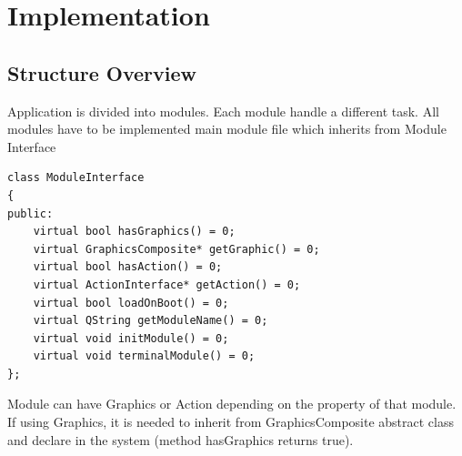 \documentclass[11pt]{article}
\begin{document}
\begin{figure}[H] 
  \label{fig:Gantt}
\end{figure} 

\section{Implementation}
\subsection{Structure Overview} 
Application is divided into modules. Each module handle a different task.
All modules have to be implemented main module file which inherits from Module Interface

\begin{lstlisting}
class ModuleInterface
{
public:
    virtual bool hasGraphics() = 0;
    virtual GraphicsComposite* getGraphic() = 0;
    virtual bool hasAction() = 0;
    virtual ActionInterface* getAction() = 0;
    virtual bool loadOnBoot() = 0;
    virtual QString getModuleName() = 0;
    virtual void initModule() = 0;
    virtual void terminalModule() = 0;
};
\end{lstlisting}

Module can have Graphics or Action depending on the property of that module. If using Graphics, it is needed to inherit from GraphicsComposite abstract class and declare in the system (method hasGraphics returns true). 
\end{document}
